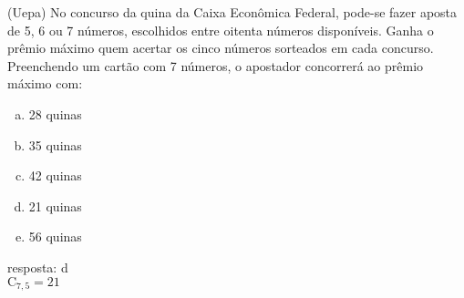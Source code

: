 \begin{ex}
(Uepa) No concurso da quina da Caixa Econômica Federal, pode-se fazer aposta de 5, 6 ou 7 números, escolhidos entre oitenta números disponíveis. Ganha o prêmio máximo quem acertar os cinco números sorteados em cada concurso. Preenchendo um cartão com 7 números, o apostador concorrerá ao prêmio máximo com:
   \begin{enumerate}[(a)]
   \item 28 quinas
   \item 35 quinas
   \item 42 quinas
   \item 21 quinas
   \item 56 quinas
   \end{enumerate}
     \begin{sol}
      resposta: d \\
      $\mathrm{C}_{7,5}=21$
     \end{sol}
\end{ex}